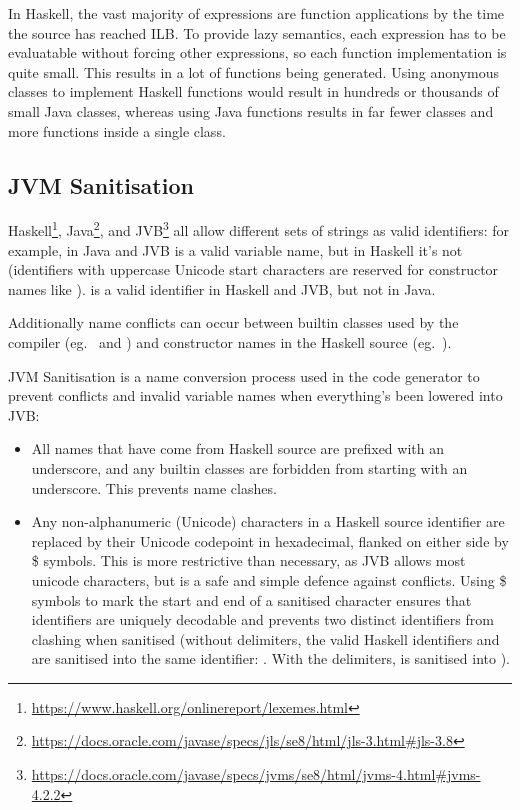 \documentclass[dissertation.tex]{subfiles}
\begin{document}
{{{            In Haskell, the vast majority of expressions are function applications by the time the source has reached ILB. To provide lazy semantics, each expression has to be evaluatable without forcing other expressions, so each function implementation is quite small. This results in a lot of functions being generated. Using anonymous classes to implement Haskell functions would result in hundreds or thousands of small Java classes, whereas using Java functions results in far fewer classes and more functions inside a single class.
        }
    }
    \subsection{JVM Sanitisation}\label{sec:jvm-sanitisation}
    {
        Haskell\footnote{\url{https://www.haskell.org/onlinereport/lexemes.html}}, Java\footnote{\url{https://docs.oracle.com/javase/specs/jls/se8/html/jls-3.html\#jls-3.8}}, and JVB\footnote{\url{https://docs.oracle.com/javase/specs/jvms/se8/html/jvms-4.html\#jvms-4.2.2}} all allow different sets of strings as valid identifiers: for example, in Java and JVB  is a valid variable name, but in Haskell it's not (identifiers with uppercase Unicode start characters are reserved for constructor names like ). \monospace{(+)} is a valid identifier in Haskell and JVB, but not in Java.

        Additionally name conflicts can occur between builtin classes used by the compiler (eg.\  and ) and constructor names in the Haskell source (eg.\ ).

        JVM Sanitisation is a name conversion process used in the code generator to prevent conflicts and invalid variable names when everything's been lowered into JVB:

        \begin{itemize}
        \item
        {
            All names that have come from Haskell source are prefixed with an underscore, and any builtin classes are forbidden from starting with an underscore. This prevents name clashes.
        }
        \item
        {
            Any non-alphanumeric (Unicode) characters in a Haskell source identifier are replaced by their Unicode codepoint in hexadecimal, flanked on either side by \$ symbols. This is more restrictive than necessary, as JVB allows most unicode characters, but is a safe and simple defence against conflicts. Using \$ symbols to mark the start and end of a sanitised character ensures that identifiers are uniquely decodable and prevents two distinct identifiers from clashing when sanitised (without delimiters, the valid Haskell identifiers \haskell{#\(\pi\)#} and  are sanitised into the same identifier: . With the delimiters, \haskell{#\(\pi\)#} is sanitised into ).
        }
        \end{itemize}
    }
}
\end{document}
